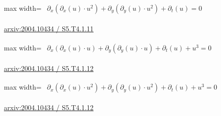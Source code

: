 \documentclass[10pt,a4paper]{article}
\begin{document}
\begin{minipage}{\linewidth}
\begin{center}\begin{adjustbox}{max width=\linewidth}$\displaystyle\begin{gathered}\begin{gathered}\partial_{x}(\partial_{x}(u)\cdot u^{2})+\partial_{y}(\partial_{y}(u)\cdot u^{2})+\partial_{t}(u)=0\end{gathered}\end{gathered}$\end{adjustbox}\end{center}
{\small \href{https://arxiv.org/html/2004.10434#S5.T4.1.11}{arxiv:2004.10434 / S5.T4.1.11}}\par
\end{minipage}\par\vspace{7mm}

\begin{minipage}{\linewidth}
\begin{center}\begin{adjustbox}{max width=\linewidth}$\displaystyle\begin{gathered}\begin{gathered}\partial_{x}(\partial_{x}(u)\cdot u)+\partial_{y}(\partial_{y}(u)\cdot u)+\partial_{t}(u)+u^{3}=0\end{gathered}\end{gathered}$\end{adjustbox}\end{center}
{\small \href{https://arxiv.org/html/2004.10434#S5.T4.1.12}{arxiv:2004.10434 / S5.T4.1.12}}\par
\end{minipage}\par\vspace{7mm}

\begin{minipage}{\linewidth}
\begin{center}\begin{adjustbox}{max width=\linewidth}$\displaystyle\begin{gathered}\begin{gathered}\partial_{x}(\partial_{x}(u)\cdot u^{2})+\partial_{y}(\partial_{y}(u)\cdot u^{2})+\partial_{t}(u)+u^{3}=0\end{gathered}\end{gathered}$\end{adjustbox}\end{center}
{\small \href{https://arxiv.org/html/2004.10434#S5.T4.1.12}{arxiv:2004.10434 / S5.T4.1.12}}\par
\end{minipage}\par\vspace{7mm}
\end{document}
